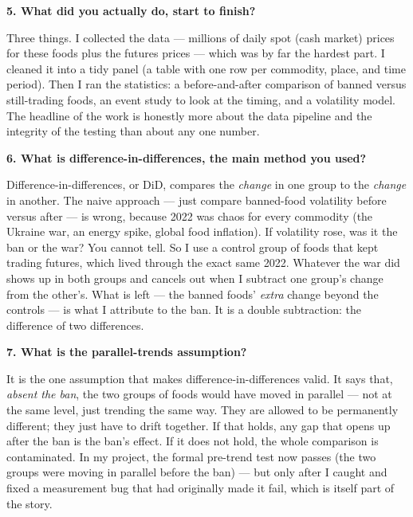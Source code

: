\documentclass[11pt]{article}
\newcommand{\Q}[1]{\medskip\noindent\textbf{#1}\par}
\newcommand{\A}{\noindent}
\begin{document}
\Q{5. What did you actually do, start to finish?}
\A Three things. I collected the data --- millions of daily spot (cash market) prices for these
foods plus the futures prices --- which was by far the hardest part. I cleaned it into a tidy panel
(a table with one row per commodity, place, and time period). Then I ran the statistics: a
before-and-after comparison of banned versus still-trading foods, an event study to look at the
timing, and a volatility model. The headline of the work is honestly more about the data pipeline
and the integrity of the testing than about any one number.

\Q{6. What is difference-in-differences, the main method you used?}
\A Difference-in-differences, or DiD, compares the \emph{change} in one group to the \emph{change} in
another. The naive approach --- just compare banned-food volatility before versus after --- is wrong,
because 2022 was chaos for every commodity (the Ukraine war, an energy spike, global food
inflation). If volatility rose, was it the ban or the war? You cannot tell. So I use a control group
of foods that kept trading futures, which lived through the exact same 2022. Whatever the war did
shows up in both groups and cancels out when I subtract one group's change from the other's. What is
left --- the banned foods' \emph{extra} change beyond the controls --- is what I attribute to the
ban. It is a double subtraction: the difference of two differences.

\Q{7. What is the parallel-trends assumption?}
\A It is the one assumption that makes difference-in-differences valid. It says that, \emph{absent
the ban}, the two groups of foods would have moved in parallel --- not at the same level, just
trending the same way. They are allowed to be permanently different; they just have to drift
together. If that holds, any gap that opens up after the ban is the ban's effect. If it does not
hold, the whole comparison is contaminated. In my project, the formal pre-trend test now passes
(the two groups were moving in parallel before the ban) --- but only after I caught and fixed a
measurement bug that had originally made it fail, which is itself part of the story.
\end{document}
